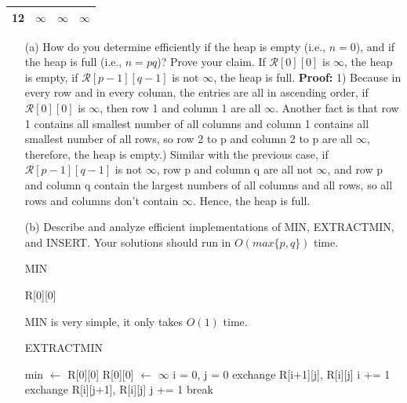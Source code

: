 \documentclass{article}       %
\begin{document}
\begin{enumerate}
\begin{tabular}{ | c | c | c | c | }
		12 & $\infty$ & $\infty$ & $\infty$ \\ \hline
	\end{tabular}\newline
	\begin{enumerate}
		\item[(a)] How do you determine efficiently if the heap is empty (i.e., $n=0$), and if the heap is full (i.e., $n=pq$)? Prove your claim.\newline\newline
		If $\mathcal{R}[0][0]$ is $\infty$, the heap is empty, if $\mathcal{R}[p-1][q-1]$ is not $\infty$, the heap is full.\newline
		\textbf{Proof:} 1) Because in every row and in every column, the entries are all in ascending order, if $\mathcal{R}[0][0]$ is $\infty$, then row 1 and column 1 are all $\infty$. Another fact is that row 1 contains all smallest number of all columns and column 1 contains all smallest number of all rows, so row 2 to p and column 2 to p are all $\infty$, therefore, the heap is empty.) Similar with the previous case, if $\mathcal{R}[p-1][q-1]$ is not $\infty$, row p and column q are all not $\infty$, and row p and column q contain the largest numbers of all columns and all rows, so all rows and columns don't contain $\infty$. Hence, the heap is full.\newline
		\item[(b)] Describe and analyze efficient implementations of MIN, EXTRACTMIN, and INSERT. Your solutions should run in $O(max\{p,q\})$ time.
		\begin{algorithm}[H]
			\caption{MIN}
			\small
			\begin{algorithmic}[1]
				\State \Return R[0][0]
				\EndProcedure
			\end{algorithmic}\label{p1}
		\end{algorithm}
		MIN is very simple, it only takes $O(1)$ time.
		\begin{algorithm}[H]
			\caption{EXTRACTMIN}
			\small
			\begin{algorithmic}[1]
				\State min $\gets$ R[0][0]
				\State R[0][0] $\gets$ $\infty$
				\State i = 0, j  = 0
				\State exchange R[i+1][j], R[i][j]
				\State i += 1
				\Else
				\State exchange R[i][j+1], R[i][j]
				\State j += 1
				\EndIf
				\State break
				\EndIf

\end{algorithmic}
\end{algorithm}
\end{enumerate}
\end{enumerate}
\end{document}
